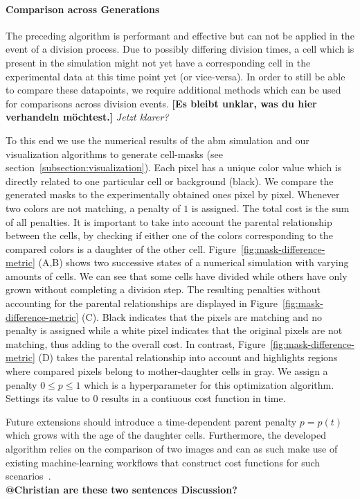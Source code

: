 \documentclass[10pt,letterpaper]{article}
\begin{document}
\paragraph{Comparison across Generations}
The preceding algorithm is performant and effective but can not be applied in the event of a
division process.
Due to possibly differing division times, a cell which is present in the simulation might not yet
have a corresponding cell in the experimental data at this time point yet (or vice-versa).
In order to still be able to compare these datapoints, we require additional methods which can be
used for comparisons across division events.
\textbf{[Es bleibt unklar, was du hier verhandeln möchtest.]}
\textit{Jetzt klarer?}

To this end we use the numerical results of the \ac{abm} simulation and our visualization
algorithms to generate cell-masks (see section~\ref{subsection:visualization}).
Each pixel has a unique color value which is directly related to one particular cell or background
(black).
We compare the generated masks to the experimentally obtained ones pixel by pixel.
Whenever two colors are not matching, a penalty of $1$ is assigned.
The total cost is the sum of all penalties.
It is important to take into account the parental relationship between the cells, by checking if
either one of the colors corresponding to the compared colors is a daughter of the other cell.
Figure~\ref{fig:mask-difference-metric} (A,B) shows two successive states of a numerical simulation
with varying amounts of cells.
We can see that some cells have divided while others have only grown without completing a division
step.
The resulting penalties without accounting for the parental relationships are displayed in
Figure~\ref{fig:mask-difference-metric} (C).
Black indicates that the pixels are matching and no penalty is assigned while a white pixel
indicates that the original pixels are not matching, thus adding to the overall cost.
In contrast, Figure~\ref{fig:mask-difference-metric} (D) takes the parental relationship into
account and highlights regions where compared pixels belong to mother-daughter cells in gray.
We assign a penalty $0\leq p \leq 1$ which is a hyperparameter for this optimization algorithm.
Settings its value to $0$ results in a contiuous cost function in time.

Future extensions should introduce a time-dependent parent penalty $p=p(t)$ which grows with the age
of the daughter cells.
Furthermore, the developed algorithm relies on the comparison of two images and can as such make use
of existing machine-learning workflows that construct cost functions for such
scenarios~\cite{Dice1945}.\\
\textbf{@Christian are these two sentences Discussion?}
\end{document}
